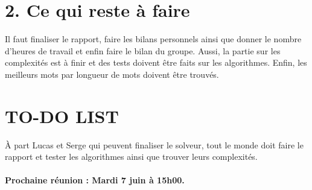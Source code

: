 \section*{2. Ce qui reste à faire}
\tabto{1cm} Il faut finaliser le rapport, faire les bilans personnels ainsi que donner le nombre d'heures de travail et enfin faire le bilan du groupe. Aussi, la partie sur les complexités est à finir et des tests doivent être faits sur les algorithmes. Enfin, les meilleurs mots par longueur de mots doivent être trouvés. \\

\section*{TO-DO LIST}

À part Lucas et Serge qui peuvent finaliser le solveur, tout le monde doit faire le rapport et tester les algorithmes ainsi que trouver leurs complexités. \\ \\
\tabto{0cm}\textbf{Prochaine réunion : Mardi 7 juin à 15h00.}